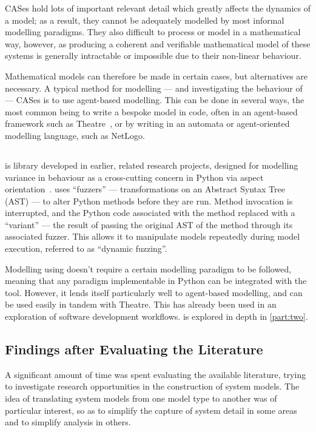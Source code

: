 \documentclass[draft]{article}
\begin{document}
CASes hold lots of important relevant detail which greatly affects the dynamics
of a model; as a result, they cannot be adequately modelled by most informal
modelling paradigms. They also difficult to process or model in a mathematical
way, however, as producing a coherent and verifiable mathematical model of these
systems is generally intractable or impossible due to their non-linear
behaviour\cite{holland_studying_adaptive_systems}.\par

Mathematical models can therefore be made in certain cases, but alternatives are
necessary. A typical method for modelling --- and investigating the behaviour of
--- CASes is to use agent-based modelling\cite{hewitt}. This can be done in
several ways, the most common being to write a bespoke model in code, often in
an agent-based framework such as Theatre~\cite{theatre_repo}, or by writing in
an automata or agent-oriented modelling language, such as
NetLogo\cite{netlogo}.\par


\subsection{\pdsf{}}
\pdsf{} is library developed in earlier, related research projects, designed for
modelling variance in behaviour as a cross-cutting concern in Python via
aspect orientation~\cite{aspect_orientation}. \pdsf{} uses ``fuzzers'' ---
transformations on an Abstract Syntax Tree (AST) --- to alter Python methods
before they are run. Method invocation is interrupted, and the Python code
associated with the method replaced with a ``variant'' --- the result of passing
the original AST of the method through its associated fuzzer. This allows it to
manipulate models repeatedly during model execution, referred to as ``dynamic
fuzzing''.\par

Modelling using \pdsf{} doesn't require a certain modelling paradigm to be
followed, meaning that any paradigm implementable in Python can be integrated
with the tool. However, it lends itself particularly well to agent-based
modelling, and can be used easily in tandem with Theatre. This has already been
used in an exploration of software development workflows\cite{caise_forum_18}.
\pdsf{} is explored in depth in \cref{part:two}.\par

\subsection{Findings after Evaluating the Literature}
A significant amount of time was spent evaluating the available literature,
trying to investigate research opportunities in the construction of system
models. The idea of translating system models from one model type to another was
of particular interest, so as to simplify the capture of system detail in some
areas and to simplify analysis in others.\par
\end{document}
